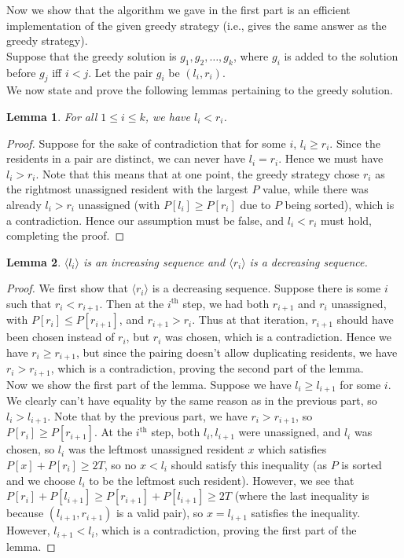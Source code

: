 \documentclass[answers]{exam}
\newtheorem{lemma}{Lemma}
\newcommand{\nl}{\vspace{0.2cm}\\}
\begin{document}
\begin{questions}
\begin{solution}
Now we show that the algorithm we gave in the first part is an efficient implementation of the given greedy strategy (i.e., gives the same answer as the greedy strategy).\nl
Suppose that the greedy solution is $g_1, g_2, \dots, g_k$, where $g_i$ is added to the solution before $g_j$ iff $i < j$. Let the pair $g_i$ be $(l_i, r_i)$.\nl
We now state and prove the following lemmas pertaining to the greedy solution.
\begin{lemma}
For all $1 \le i \le k$, we have $l_i < r_i$. 
\end{lemma}
\begin{proof}
Suppose for the sake of contradiction that for some $i$, $l_i \ge r_i$.
Since the residents in a pair are distinct, we can never have $l_i = r_i$. Hence we must have $l_i > r_i$. Note that this means that at one point, the greedy strategy chose $r_i$ as the rightmost unassigned resident with the largest $P$ value, while there was already $l_i > r_i$ unassigned (with $P[l_i] \ge P[r_i]$ due to $P$ being sorted), which is a contradiction. Hence our assumption must be false, and $l_i < r_i$ must hold, completing the proof.
\end{proof}
\begin{lemma}
$\langle l_i \rangle$ is an increasing sequence and $\langle r_i \rangle$ is a decreasing sequence.
\end{lemma}
\begin{proof}
We first show that $\langle r_i \rangle$ is a decreasing sequence. Suppose there is some $i$ such that $r_i < r_{i + 1}$. Then at the $i^\mathrm{th}$ step, we had both $r_{i + 1}$ and $r_{i}$ unassigned, with $P[r_{i}] \le P[r_{i + 1}]$, and $r_{i + 1} > r_{i}$. Thus at that iteration, $r_{i + 1}$ should have been chosen instead of $r_i$, but $r_i$ was chosen, which is a contradiction. Hence we have $r_i \ge r_{i + 1}$, but since the pairing doesn't allow duplicating residents, we have $r_i > r_{i + 1}$, which is a contradiction, proving the second part of the lemma.\nl
Now we show the first part of the lemma. Suppose we have $l_i \ge l_{i + 1}$ for some $i$. We clearly can't have equality by the same reason as in the previous part, so $l_i > l_{i + 1}$. Note that by the previous part, we have $r_i > r_{i + 1}$, so $P[r_i] \ge P[r_{i + 1}]$. At the $i^\mathrm{th}$ step, both $l_i, l_{i + 1}$ were unassigned, and $l_i$ was chosen, so $l_i$ was the leftmost unassigned resident $x$ which satisfies $P[x] + P[r_i] \ge 2T$, so no $x < l_i$ should satisfy this inequality (as $P$ is sorted and we choose $l_i$ to be the leftmost such resident). However, we see that $P[r_i] + P[l_{i + 1}] \ge P[r_{i + 1}] + P[l_{i + 1}] \ge 2T$ (where the last inequality is because $(l_{i + 1}, r_{i + 1})$ is a valid pair), so $x = l_{i + 1}$ satisfies the inequality. However, $l_{i + 1} < l_i$, which is a contradiction, proving the first part of the lemma.

\end{proof}
\end{solution}
\end{questions}
\end{document}
